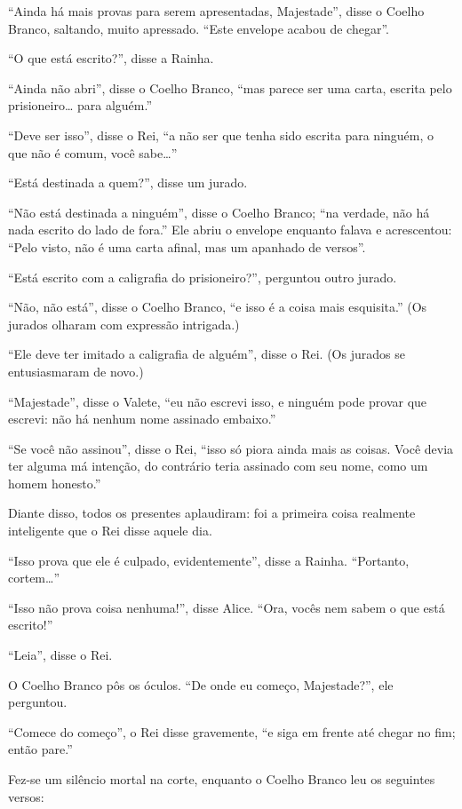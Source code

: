 ``Ainda há mais provas para serem apresentadas, Majestade'', disse o
Coelho Branco, saltando, muito apressado. ``Este envelope acabou de
chegar''.

``O que está escrito?'', disse a Rainha.

``Ainda não abri'', disse o Coelho Branco, ``mas parece ser uma carta,
escrita pelo prisioneiro\ldots{} para alguém.''

``Deve ser isso'', disse o Rei, ``a não ser que tenha sido escrita para
ninguém, o que não é comum, você sabe\ldots{}''

``Está destinada a quem?'', disse um jurado.

``Não está destinada a ninguém'', disse o Coelho Branco; ``na verdade,
não há nada escrito do lado de fora.'' Ele abriu o envelope enquanto
falava e acrescentou: ``Pelo visto, não é uma carta afinal, mas um
apanhado de versos''.

``Está escrito com a caligrafia do prisioneiro?'', perguntou outro
jurado.

``Não, não está'', disse o Coelho Branco, ``e isso é a coisa mais
esquisita.'' (Os jurados olharam com expressão intrigada.)

``Ele deve ter imitado a caligrafia de alguém'', disse o Rei. (Os
jurados se entusiasmaram de novo.)

``Majestade'', disse o Valete, ``eu não escrevi isso, e ninguém pode
provar que escrevi: não há nenhum nome assinado embaixo.''

``Se você não assinou'', disse o Rei, ``isso só piora ainda mais as
coisas. Você devia ter alguma má intenção, do contrário teria assinado
com seu nome, como um homem honesto.''

Diante disso, todos os presentes aplaudiram: foi a primeira coisa
realmente inteligente que o Rei disse aquele dia.

``Isso prova que ele é culpado, evidentemente'', disse a Rainha.
``Portanto, cortem\ldots{}''

``Isso não prova coisa nenhuma!'', disse Alice. ``Ora, vocês nem sabem o
que está escrito!''

``Leia'', disse o Rei.

O Coelho Branco pôs os óculos. ``De onde eu começo, Majestade?'', ele
perguntou.

``Comece do começo'', o Rei disse gravemente, ``e siga em frente até
chegar no fim; então pare.''

Fez-se um silêncio mortal na corte, enquanto o Coelho Branco leu os
seguintes versos:

